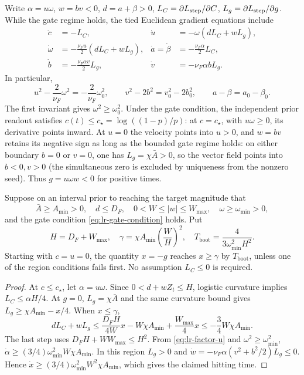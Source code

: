 Write $\alpha=u\omega$, $w=bv<0$, $d=a+\beta>0$,
$L_C=\partial L_{\mathrm{step}}/\partial C$, $L_g=\partial L_{\mathrm{step}}/\partial g$.
While the gate regime holds, the tied Euclidean gradient equations include
\begin{align}
 \dot c&=-L_C,
 &\dot u&=-\omega(dL_C+wL_g),\label{eq:lr-factor-u}\\
 \dot\omega&=-\tfrac{\nu_Fu}{2}(dL_C+wL_g),
 &\dot a=\dot\beta&=-\tfrac{\nu_F\alpha}{2}L_C,\\
 \dot b&=-\tfrac{\nu_F\alpha v}{2}L_g,
 &\dot v&=-\nu_F\alpha bL_g.
 \label{eq:lr-factor-bv}
\end{align}
In particular,
\begin{equation}\label{eq:lr-factor-invariants}
 u^2-\frac{2}{\nu_F}\omega^2=-\frac{2}{\nu_F}\omega_0^2,
 \qquad
 v^2-2b^2=v_0^2-2b_0^2,
 \qquad a-\beta=a_0-\beta_0.
\end{equation}
The first invariant gives $\omega^2\ge\omega_0^2$.  Under the gate
condition, the independent prior readout satisfies
$c(t)\le c_\star=\log((1-p)/p)$: at $c=c_\star$, with $u\omega\ge0$,
its derivative points inward.  At $u=0$ the velocity points into $u>0$,
and $w=bv$ retains its negative sign as long as the bounded gate regime
holds: on either boundary $b=0$ or $v=0$, one has $L_g=\chi\bar A>0$,
so the vector field points into $b<0,v>0$ (the simultaneous zero is excluded
by uniqueness from the nonzero seed). Thus $g=u\omega w<0$ for positive times.

\begin{lrlemma}
\label{lem:lr-feature-bootstrap}
Suppose on an interval prior to reaching the target magnitude that
\begin{equation}\label{eq:lr-amplification-region}
 \bar A\ge A_{\min}>0,\quad
 d\le D_F,\quad
 0<W\le|w|\le W_{\max},\quad
 \omega\ge\omega_{\min}>0,
\end{equation}
and the gate condition \eqref{eq:lr-gate-condition} holds.  Put
\begin{equation}\label{eq:lr-gamma-bootstrap}
 H=D_F+W_{\max},\quad
 \gamma=\chi A_{\min}\left(\frac W H\right)^2,
 \quad
 T_{\mathrm{boot}}=\frac4{3\omega_{\min}^2H^2}.
\end{equation}
Starting with $c=u=0$, the quantity $x=-g$ reaches $x\ge\gamma$
by $T_{\mathrm{boot}}$, unless one of the region conditions fails first.
No assumption $L_C\le0$ is required.
\end{lrlemma}
\begin{proof}
At $c\le c_\star$, let $\alpha=u\omega$.  Since
$0<d+wZ_t\le H$, logistic curvature implies
$L_C\le\alpha H/4$.  At $g=0$, $L_g=\chi\bar A$ and the
same curvature bound gives $L_g\ge\chi A_{\min}-x/4$.
When $x\le\gamma$,
\[
 dL_C+wL_g
 \le\frac{D_FH}{4W}x-W\chi A_{\min}
 +\frac{W_{\max}}4x
 \le-\frac34W\chi A_{\min}.
\]
The last step uses
$D_FH+WW_{\max}\le H^2$.
From \eqref{eq:lr-factor-u} and
$\omega^2\ge\omega_{\min}^2$,
$\dot\alpha\ge(3/4)\omega_{\min}^2W\chi A_{\min}$.
In this region $L_g>0$ and
$\dot w=-\nu_F\alpha(v^2+b^2/2)L_g\le0$.
Hence $\dot x\ge(3/4)\omega_{\min}^2W^2\chi A_{\min}$,
which gives the claimed hitting time.
\end{proof}

